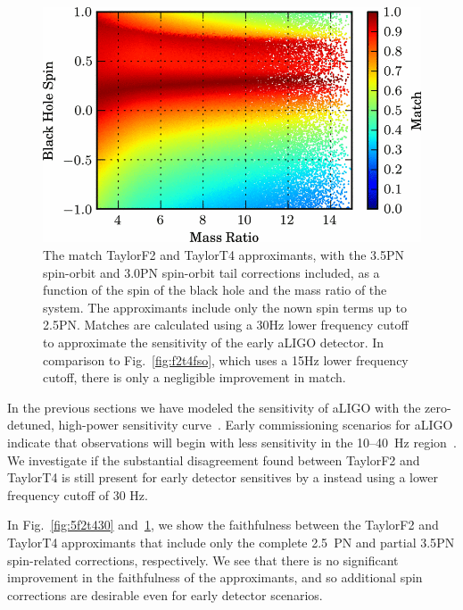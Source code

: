\begin{figure}
\begin{center}
\includegraphics[width=1.0\textwidth]{papers/nsbh_faithfulness/figure16.png}
\end{center}
\caption{\label{fig:7f2t430}The match TaylorF2 and
TaylorT4 approximants, with the 3.5\ac{PN} spin-orbit and 3.0\ac{PN} spin-orbit tail corrections
included, as a function of the spin of the black hole
and the mass ratio of the system.  The approximants include only the nown
spin terms up to 2.5\ac{PN}. Matches are calculated using a 30Hz lower frequency cutoff to
approximate the sensitivity of the early \ac{aLIGO} detector. In comparison to Fig.~\ref{fig:f2t4fso}, which uses a 15Hz lower
frequency cutoff, there is only a negligible improvement in match. }
\end{figure}

In the previous sections we have modeled the sensitivity of aLIGO
with the 
zero-detuned, high-power sensitivity curve~\cite{aLIGOSensCurves}. 
Early commissioning scenarios for \ac{aLIGO}
indicate that observations will begin with less sensitivity in the 10--40~Hz
region~\cite{Aasi:2013wya}. We investigate if the substantial disagreement found between TaylorF2 and TaylorT4 is still present for 
early detector sensitives by a instead using a lower frequency cutoff of 30 Hz. 

In Fig.~\ref{fig:5f2t430} and~\ref{fig:7f2t430}, we show the faithfulness between the TaylorF2 and TaylorT4 
approximants that include only the complete 2.5~\ac{PN} and partial 3.5\ac{PN} spin-related corrections, respectively. 
We see that there is no significant improvement in the faithfulness of the approximants,
and so additional spin corrections are desirable even for early detector scenarios. 

